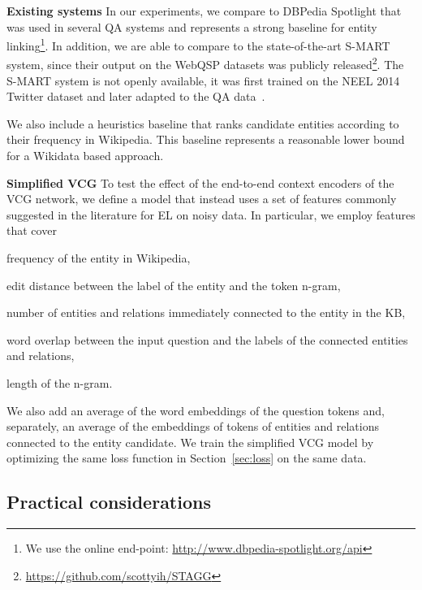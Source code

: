 \documentclass[11pt,a4paper]{article}
\begin{document}
\textbf{Existing systems}
In our experiments, we compare to DBPedia Spotlight that was used in several QA systems and represents a strong baseline for entity linking\footnote{We use the online end-point: \url{http://www.dbpedia-spotlight.org/api}}. In addition, we are able to compare to the state-of-the-art S-MART system, since their output on the WebQSP datasets was publicly released\footnote{\url{https://github.com/scottyih/STAGG}}. The S-MART system is not openly available, it was first trained on the NEEL 2014 Twitter dataset and later adapted to the QA data~\citep{Yih2015}. 

We also include a heuristics baseline that ranks candidate entities according to their frequency in Wikipedia. This baseline represents a reasonable lower bound for a Wikidata based approach.

\textbf{Simplified VCG}
To test the effect of the end-to-end context encoders of the VCG network, we define a model that instead uses a set of features commonly suggested in the literature for EL on noisy data. In particular, we employ features that cover 
\begin{enumerate*}[label=(\arabic*)]
  \item frequency of the entity in Wikipedia,
  \item edit distance between the label of the entity and the token n-gram,
  \item number of entities and relations immediately connected to the entity in the KB,
  \item word overlap between the input question and the labels of the connected entities and relations,
  \item length of the n-gram.
\end{enumerate*}
We also add an average of the word embeddings of the question tokens and, separately, an average of the embeddings of tokens of entities and relations connected to the entity candidate. We train the simplified VCG model by optimizing the same loss function in Section~\ref{sec:loss} on the same data.


\subsection{Practical considerations}
\end{document}
